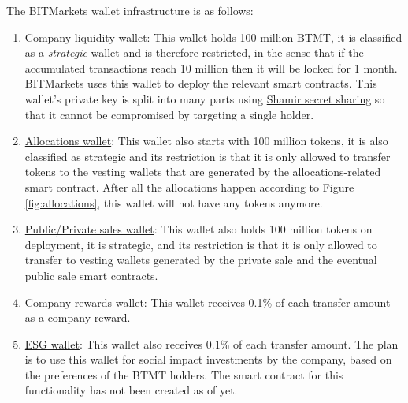 \documentclass[a4paper,12pt]{article}
\begin{document}
The BITMarkets wallet infrastructure is as follows:
\begin{enumerate}
  \item \label{wallet:liquidity} \href{https://polygonscan.com/address/0x1db09232E83AfE4e130012cDf0e9d5E1565052c3}{Company liquidity wallet}: This wallet holds 100 million BTMT, it is classified as a \textit{strategic} wallet and is therefore
  restricted,
  in the sense that if the accumulated transactions reach 10 million then it will be locked for 1 month. BITMarkets uses this wallet to deploy the relevant smart contracts. This wallet's private key is split into many parts using \href{https://en.wikipedia.org/wiki/Shamir\%27s_secret_sharing}{Shamir secret sharing} so that it cannot be compromised by targeting a single holder.

  \item \label{wallet:allocations} \href{https://polygonscan.com/address/0xA2cea64b085c991e1ceb9315D02dE45bbCac720b}{Allocations wallet}: This wallet also starts with 100 million tokens, it is also classified as strategic and its restriction is that it is only allowed to transfer tokens to the vesting wallets that are generated by the allocations-related smart contract. After all the allocations happen according to Figure \ref{fig:allocations}, this wallet will not have any tokens anymore.

  \item \label{wallet:crowdsales} \href{https://polygonscan.com/address/0xdAE2CB88b1E8b037aB55fb7c1F210365aFE710a9}{Public/Private sales wallet}: This wallet also holds 100 million tokens on deployment, it is strategic, and its restriction is that it is only allowed to transfer to vesting wallets generated by the private sale and the eventual public sale smart contracts.

  \item \label{wallet:rewards} \href{https://polygonscan.com/address/0x51613cC607Ce45F8F16df8600B35E4c77706605D}{Company rewards wallet}: This wallet receives 0.1\% of each transfer amount as a company reward.

  \item \label{wallet:esg} \href{https://polygonscan.com/address/0x12427f293580556B202B518fa0865faF5Bac4337}{ESG wallet}: This wallet also receives 0.1\% of each transfer amount. The plan is to use this wallet for social impact investments by the company, based on the preferences of the BTMT holders. The smart contract for this functionality has not been created as of yet.


\end{enumerate}
\end{document}
